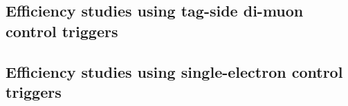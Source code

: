 %

\subsection{Efficiency studies using tag-side di-muon control triggers}



\subsection{Efficiency studies using single-electron control triggers}

